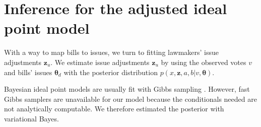 

\section{Inference for the adjusted ideal point model}
\label{sec:inference}
With a way to map bills to issues, we turn to fitting lawmakers'
issue adjustments $\bm z_u$.  We estimate issue adjustments $\bm z_u$
by using the observed votes $v$ and bills' issues $\bm \theta_d$ with
the posterior distribution $p(x, \bm z, a, b | v, \bm \theta).$

Bayesian ideal point models are usually fit with Gibbs sampling
\citep{johnson:1999ch6,jackman:2001,martin:2002,clinton:2004}. However,
fast Gibbs samplers are unavailable for our model because the
conditionals needed are not analytically computable.  We therefore
estimated the posterior with variational Bayes.


